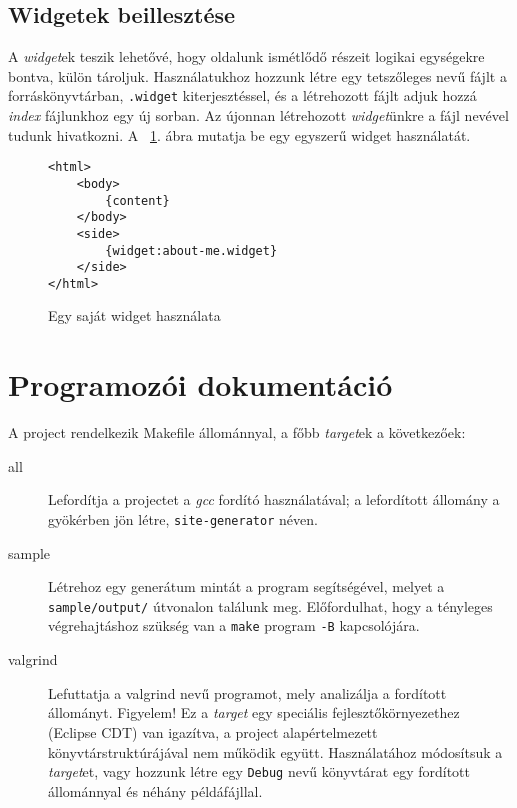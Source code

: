\documentclass[a4paper,10pt]{article}
\begin{document}
\subsection{Widgetek beillesztése}
A \emph{widget}ek teszik lehetővé, hogy oldalunk ismétlődő részeit logikai egységekre bontva, külön tároljuk. Használatukhoz hozzunk létre egy tetszőleges nevű fájlt a forráskönyvtárban, \texttt{.widget} kiterjesztéssel, és a létrehozott fájlt adjuk hozzá \emph{index} fájlunkhoz egy új sorban. Az újonnan létrehozott \emph{widget}ünkre a fájl nevével tudunk hivatkozni. A ~\ref{fig:widget}. ábra mutatja be egy egyszerű widget használatát.

\begin{figure}[h!]
	\begin{center}
		\begin{lstlisting}
<html>
	<body>
		{content}
	</body>
	<side>
		{widget:about-me.widget}
	</side>
</html>
		\end{lstlisting}
		\caption{Egy saját widget használata}
		\label{fig:widget}
	\end{center}
\end{figure}


\section{Programozói dokumentáció}
A project rendelkezik Makefile állománnyal, a főbb \emph{target}ek a következőek:

\begin{description}
	\item[all] Lefordítja a projectet a \emph{gcc} fordító használatával; a lefordított állomány a gyökérben jön létre, \texttt{site-generator} néven.

	\item[sample] Létrehoz egy generátum mintát a program segítségével, melyet a \texttt{sample/output/} útvonalon találunk meg. Előfordulhat, hogy a tényleges végrehajtáshoz szükség van a \texttt{make} program \texttt{-B} kapcsolójára.

	\item[valgrind] Lefuttatja a valgrind nevű programot, mely analizálja a fordított állományt. Figyelem! Ez a \emph{target} egy speciális fejlesztőkörnyezethez (Eclipse CDT) van igazítva, a project alapértelmezett könyvtárstruktúrájával nem működik együtt. Használatához módosítsuk a \emph{target}et, vagy hozzunk létre egy \texttt{Debug} nevű könyvtárat egy fordított állománnyal és néhány példáfájllal.
\end{description}
\end{document}

